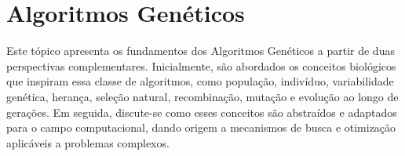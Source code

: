 \section{Algoritmos Genéticos}
\label{sec:2.3}

Este tópico apresenta os fundamentos dos Algoritmos Genéticos a partir de duas perspectivas complementares. Inicialmente, são abordados os conceitos biológicos que inspiram essa classe de algoritmos, como população, indivíduo, variabilidade genética, herança, seleção natural, recombinação, mutação e evolução ao longo de gerações. Em seguida, discute-se como esses conceitos são abstraídos e adaptados para o campo computacional, dando origem a mecanismos de busca e otimização aplicáveis a problemas complexos.



